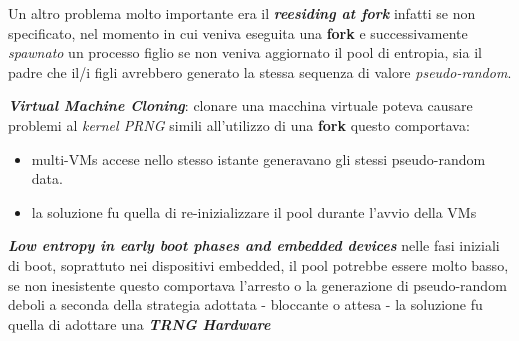 \begin{flushleft}
    \smallskip

    Un altro problema molto importante era il \textbf{\textit{reesiding at fork}} infatti se non specificato, nel momento in cui veniva eseguita una \textbf{fork} e successivamente \textit{spawnato} un processo figlio se non veniva aggiornato il pool di entropia, sia il padre che il/i figli avrebbero generato la stessa sequenza di valore \textit{pseudo-random}.

    \smallskip

    \textbf{\textit{Virtual Machine Cloning}}: clonare una macchina virtuale poteva causare problemi al \textit{kernel PRNG} simili all'utilizzo di una \textbf{fork} questo comportava:
    \begin{itemize}[nosep]
        \item multi-VMs accese nello stesso istante generavano gli stessi pseudo-random data.
        \item la soluzione fu quella di re-inizializzare il pool durante l'avvio della VMs
    \end{itemize}

    \smallskip

    \textbf{\textit{Low entropy in early boot phases and embedded devices}} nelle fasi iniziali di boot, soprattuto nei dispositivi embedded, il pool potrebbe essere molto basso, se non inesistente questo comportava l'arresto o la generazione di pseudo-random deboli a seconda della strategia adottata - bloccante o attesa - la soluzione fu quella di adottare una \textbf{\textit{TRNG Hardware}}
\end{flushleft}